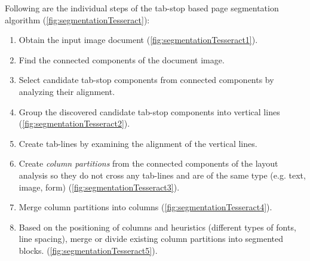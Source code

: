 Following are the individual steps of the tab-stop based page segmentation algorithm (\cref{fig:segmentationTesseract}):
\begin{enumerate}
    \item Obtain the input image document (\cref{fig:segmentationTesseract1}).
    \item Find the connected components of the document image.
    \item Select candidate tab-stop components from connected components by analyzing their alignment.
    \item Group the discovered candidate tab-stop components into vertical lines (\cref{fig:segmentationTesseract2}).
    \item Create tab-lines by examining the alignment of the vertical lines.
    \item Create \emph{column partitions} from the connected components of the layout analysis so they do not cross any tab-lines and are of the same type (e.g. text, image, form) (\cref{fig:segmentationTesseract3}).
    \item Merge column partitions into columns (\cref{fig:segmentationTesseract4}).
    \item Based on the positioning of columns and heuristics (different types of fonts, line spacing), merge or divide existing column partitions into segmented blocks. (\cref{fig:segmentationTesseract5}).
\end{enumerate}

